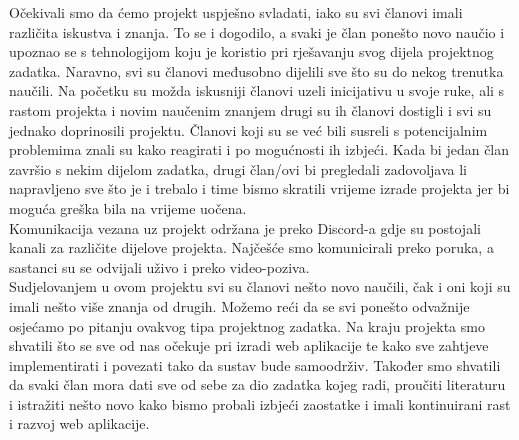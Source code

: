 		Očekivali smo da ćemo projekt uspješno svladati, iako su svi članovi imali različita iskustva i znanja. To se i dogodilo, a svaki je član ponešto novo naučio i upoznao se s tehnologijom koju je koristio pri rješavanju svog dijela projektnog zadatka. Naravno, svi su članovi međusobno dijelili sve što su do nekog trenutka naučili. Na početku su možda iskusniji članovi uzeli inicijativu u svoje ruke, ali s rastom projekta i novim naučenim znanjem drugi su ih članovi dostigli i svi su jednako doprinosili projektu. Članovi koji su se već bili susreli s potencijalnim problemima znali su kako reagirati i po mogućnosti ih izbjeći. Kada bi jedan član završio s nekim dijelom zadatka, drugi član/ovi bi pregledali zadovoljava li napravljeno sve što je i trebalo i time bismo skratili vrijeme izrade projekta jer bi moguća greška bila na vrijeme uočena.\\
		Komunikacija vezana uz projekt održana je preko Discord-a gdje su postojali kanali za različite dijelove projekta. Najčešće smo komunicirali preko poruka, a sastanci su se odvijali uživo i preko video-poziva. \\
		Sudjelovanjem u ovom projektu svi su članovi nešto novo naučili, čak i oni koji su imali nešto više znanja od drugih. Možemo reći da se svi ponešto odvažnije osjećamo po pitanju ovakvog tipa projektnog zadatka. Na kraju projekta smo shvatili što se sve od nas očekuje pri izradi web aplikacije te kako sve zahtjeve implementirati i povezati tako da sustav bude samoodrživ. Također smo shvatili da svaki član mora dati sve od sebe za dio zadatka kojeg radi, proučiti literaturu i istražiti nešto novo kako bismo probali izbjeći zaostatke i imali kontinuirani rast i razvoj web aplikacije.
		
		\eject 
